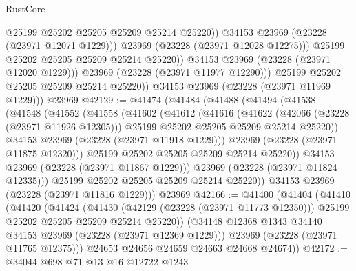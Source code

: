 \begin{lexlean}{RustCore}
\begin{coremodule}
                          @25199
                          @25202
                          @25205
                          @25209
                          @25214
                          @25220))
                      @34153
                      @23969
                      (@23228 (@23971 @12071 @1229)))
                    @23969
                    (@23228 (@23971 @12028 @12275)))
                  @25199
                  @25202
                  @25205
                  @25209
                  @25214
                  @25220))
              @34153
              @23969
              (@23228 (@23971 @12020 @1229)))
            @23969
            (@23228 (@23971 @11977 @12290)))
          @25199
          @25202
          @25205
          @25209
          @25214
          @25220))
      @34153
      @23969
      (@23228 (@23971 @11969 @1229)))
    @23969
@42129 := @41474
    (@41484
      (@41488
        (@41494
          (@41538
            (@41548
              (@41552
                (@41558
                  (@41602
                    (@41612
                      (@41616
                        (@41622
                          (@42066 (@23228 (@23971 @11926 @12305)))
                          @25199
                          @25202
                          @25205
                          @25209
                          @25214
                          @25220))
                      @34153
                      @23969
                      (@23228 (@23971 @11918 @1229)))
                    @23969
                    (@23228 (@23971 @11875 @12320)))
                  @25199
                  @25202
                  @25205
                  @25209
                  @25214
                  @25220))
              @34153
              @23969
              (@23228 (@23971 @11867 @1229)))
            @23969
            (@23228 (@23971 @11824 @12335)))
          @25199
          @25202
          @25205
          @25209
          @25214
          @25220))
      @34153
      @23969
      (@23228 (@23971 @11816 @1229)))
    @23969
@42166 := @41400
    (@41404
      (@41410
        (@41420
          (@41424
            (@41430
              (@42129 (@23228 (@23971 @11773 @12350)))
              @25199
              @25202
              @25205
              @25209
              @25214
              @25220))
          (@34148 @12368 @1343 @34140 @34153 @23969 (@23228 (@23971 @12369 @1229)))
          @23969
          (@23228 (@23971 @11765 @12375)))
        @24653
        @24656
        @24659
        @24663
        @24668
        @24674))
@42172 := @34044 @698 @71 @13 @16 @12722 @1243

\end{coremodule}
\end{lexlean}
